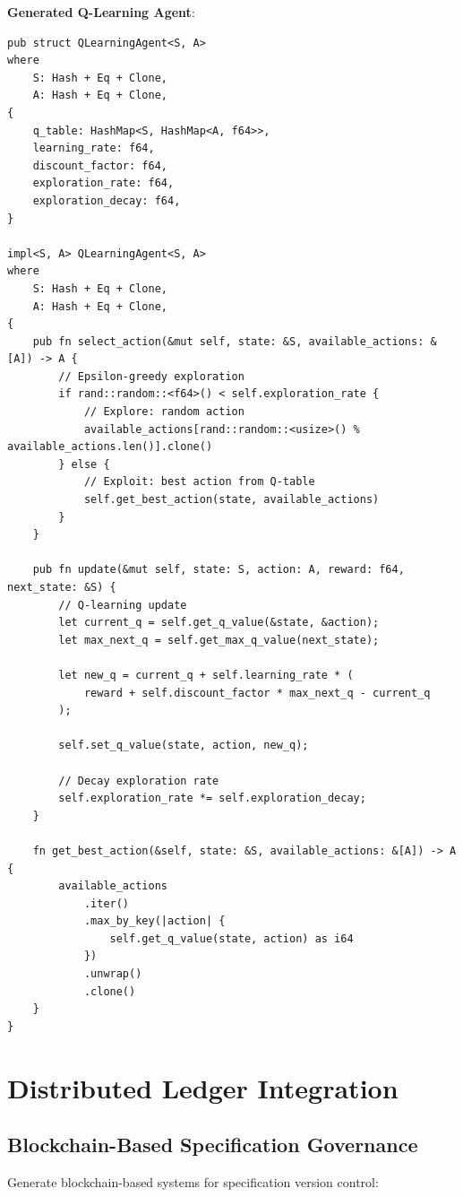 \textbf{Generated Q-Learning Agent}:

\begin{verbatim}
pub struct QLearningAgent<S, A>
where
    S: Hash + Eq + Clone,
    A: Hash + Eq + Clone,
{
    q_table: HashMap<S, HashMap<A, f64>>,
    learning_rate: f64,
    discount_factor: f64,
    exploration_rate: f64,
    exploration_decay: f64,
}

impl<S, A> QLearningAgent<S, A>
where
    S: Hash + Eq + Clone,
    A: Hash + Eq + Clone,
{
    pub fn select_action(&mut self, state: &S, available_actions: &[A]) -> A {
        // Epsilon-greedy exploration
        if rand::random::<f64>() < self.exploration_rate {
            // Explore: random action
            available_actions[rand::random::<usize>() % available_actions.len()].clone()
        } else {
            // Exploit: best action from Q-table
            self.get_best_action(state, available_actions)
        }
    }

    pub fn update(&mut self, state: S, action: A, reward: f64, next_state: &S) {
        // Q-learning update
        let current_q = self.get_q_value(&state, &action);
        let max_next_q = self.get_max_q_value(next_state);

        let new_q = current_q + self.learning_rate * (
            reward + self.discount_factor * max_next_q - current_q
        );

        self.set_q_value(state, action, new_q);

        // Decay exploration rate
        self.exploration_rate *= self.exploration_decay;
    }

    fn get_best_action(&self, state: &S, available_actions: &[A]) -> A {
        available_actions
            .iter()
            .max_by_key(|action| {
                self.get_q_value(state, action) as i64
            })
            .unwrap()
            .clone()
    }
}
\end{verbatim}

\section{Distributed Ledger Integration}

\subsection{Blockchain-Based Specification Governance}

Generate blockchain-based systems for specification version control:

